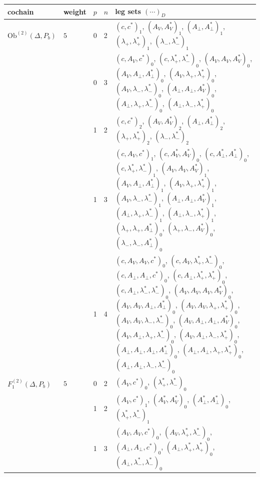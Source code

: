 \documentclass[11pt]{article}
\numberwithin{equation}{section}
\theoremstyle{plain}
\theoremstyle{definition}
\newcommand{\Ob}{\mathrm{Ob}}
\begin{document}
{\begin{longtable}{>{\raggedright}p{2.3cm}|p{0.6cm}|p{0.25cm}|p{0.25cm}|>{\raggedright\arraybackslash}p{11.6cm}}
cochain & weight & $p$ & $n$ & leg sets $(\cdots)_D$\\
\hline
\endhead
$\Ob^{(2)}(\Delta,P_b)$ & $5$ & 0 & 2 & $(c,c^*)_{1}$, $(A_V,A^*_V)_{1}$, $(A_\perp,A^*_\perp)_{1}$, $(\lambda_+,\lambda^*_+)_{1}$, $(\lambda_-,\lambda^*_-)_{1}$ \\
 &  & 0 & 3 & $(c,A_V,c^*)_{0}$, $(c,\lambda^*_+,\lambda^*_-)_{0}$, $(A_V,A_V,A^*_V)_{0}$, $(A_V,A_\perp,A^*_\perp)_{0}$, $(A_V,\lambda_+,\lambda^*_+)_{0}$, $(A_V,\lambda_-,\lambda^*_-)_{0}$, $(A_\perp,A_\perp,A^*_V)_{0}$, $(A_\perp,\lambda_+,\lambda^*_-)_{0}$, $(A_\perp,\lambda_-,\lambda^*_+)_{0}$ \\
 &  & 1 & 2 & $(c,c^*)_{2}$, $(A_V,A^*_V)_{2}$, $(A_\perp,A^*_\perp)_{2}$, $(\lambda_+,\lambda^*_+)_{2}$, $(\lambda_-,\lambda^*_-)_{2}$ \\
 &  & 1 & 3 & $(c,A_V,c^*)_{1}$, $(c,A^*_V,A^*_V)_{0}$, $(c,A^*_\perp,A^*_\perp)_{0}$, $(c,\lambda^*_+,\lambda^*_-)_{1}$, $(A_V,A_V,A^*_V)_{1}$, $(A_V,A_\perp,A^*_\perp)_{1}$, $(A_V,\lambda_+,\lambda^*_+)_{1}$, $(A_V,\lambda_-,\lambda^*_-)_{1}$, $(A_\perp,A_\perp,A^*_V)_{1}$, $(A_\perp,\lambda_+,\lambda^*_-)_{1}$, $(A_\perp,\lambda_-,\lambda^*_+)_{1}$, $(\lambda_+,\lambda_+,A^*_\perp)_{0}$, $(\lambda_+,\lambda_-,A^*_V)_{0}$, $(\lambda_-,\lambda_-,A^*_\perp)_{0}$ \\
 &  & 1 & 4 & $(c,A_V,A_V,c^*)_{0}$, $(c,A_V,\lambda^*_+,\lambda^*_-)_{0}$, $(c,A_\perp,A_\perp,c^*)_{0}$, $(c,A_\perp,\lambda^*_+,\lambda^*_+)_{0}$, $(c,A_\perp,\lambda^*_-,\lambda^*_-)_{0}$, $(A_V,A_V,A_V,A^*_V)_{0}$, $(A_V,A_V,A_\perp,A^*_\perp)_{0}$, $(A_V,A_V,\lambda_+,\lambda^*_+)_{0}$, $(A_V,A_V,\lambda_-,\lambda^*_-)_{0}$, $(A_V,A_\perp,A_\perp,A^*_V)_{0}$, $(A_V,A_\perp,\lambda_+,\lambda^*_-)_{0}$, $(A_V,A_\perp,\lambda_-,\lambda^*_+)_{0}$, $(A_\perp,A_\perp,A_\perp,A^*_\perp)_{0}$, $(A_\perp,A_\perp,\lambda_+,\lambda^*_+)_{0}$, $(A_\perp,A_\perp,\lambda_-,\lambda^*_-)_{0}$ \\
\hline
$F_1^{(2)}(\Delta,P_b)$ & $5$ & 0 & 2 & $(A_V,c^*)_{0}$, $(\lambda^*_+,\lambda^*_-)_{0}$ \\
 &  & 1 & 2 & $(A_V,c^*)_{1}$, $(A^*_V,A^*_V)_{0}$, $(A^*_\perp,A^*_\perp)_{0}$, $(\lambda^*_+,\lambda^*_-)_{1}$ \\
 &  & 1 & 3 & $(A_V,A_V,c^*)_{0}$, $(A_V,\lambda^*_+,\lambda^*_-)_{0}$, $(A_\perp,A_\perp,c^*)_{0}$, $(A_\perp,\lambda^*_+,\lambda^*_+)_{0}$, $(A_\perp,\lambda^*_-,\lambda^*_-)_{0}$ \\

\end{longtable}}
\end{document}

